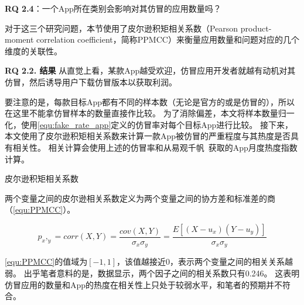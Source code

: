 {\bf RQ 2.4}：一个App所在类别会影响对其仿冒的应用数量吗？

对于这三个研究问题，本节使用了皮尔逊积矩相关系数（Pearson product-moment correlation coefficient，简称PPMCC）来衡量应用数量和问题对应的几个维度的关联性。

{\bf RQ 2.2. 结果}
从直觉上看，某款App越受欢迎，仿冒应用开发者就越有动机对其仿冒，然后诱导用户下载仿冒版本以获取利润。

要注意的是，每款目标App都有不同的样本数（无论是官方的或是仿冒的），所以在这里不能拿仿冒样本的数量直接作比较。
为了消除偏差，本文将样本数量归一化，使用\autoref{equ:fake_rate_app}定义的仿冒率对每个目标App进行比较。
接下来，本文使用了皮尔逊积矩相关系数来计算一款App被仿冒的严重程度与其热度是否具有相关性。
相关计算会使用上述的仿冒率和从易观千帆~\cite{yiguanqianfan}获取的App月度热度指数计算。

\begin{Def}
    皮尔逊积矩相关系数

    两个变量之间的皮尔逊相关系数定义为两个变量之间的协方差和标准差的商（\autoref{equ:PPMCC}）。
\end{Def}
\begin{equation}
    p_x,_y = corr(X,Y)=\frac{cov(X,Y)}{\sigma_x\sigma_y}=\frac{E[(X-u_x)(Y-u_y)]}{\sigma_x\sigma_y}
    \label{equ:PPMCC}
\end{equation}
\vspace{0.5mm}

\autoref{equ:PPMCC}的值域为$[-1, 1]$，该值越接近0，表示两个变量之间的相关关系越弱。
出乎笔者意料的是，数据显示，两个因子之间的相关系数只有0.246。
这表明仿冒应用的数量和App的热度在相关性上只处于较弱水平，和笔者的预期并不符合。


